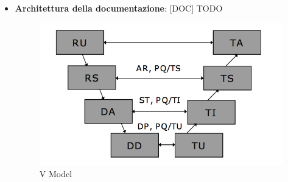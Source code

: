 \begin{itemize}
	\item \textbf{Architettura della documentazione}: [DOC] TODO
		\begin{figure}[htbp]
			\centering
			\includegraphics[scale=0.6]{img/v_model_tullio.png}
			\caption{V Model}
			\label{fig:v_model}
		\end{figure}

\end{itemize}
